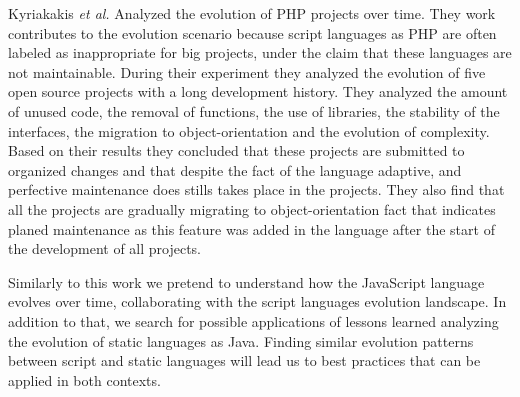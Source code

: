 Kyriakakis \emph{et al.} \cite{Kyriakakis2014ICMSE} Analyzed the evolution of PHP projects over time. They work contributes to the evolution scenario because script languages as PHP are often labeled as inappropriate for big projects, under the claim that these languages are not maintainable. During their experiment they analyzed the evolution of five open source projects with a long development history. They analyzed the amount of unused code, the removal of functions, the use of libraries, the stability of the interfaces, the migration to object-orientation and the evolution of complexity. Based on their results they concluded that these projects are submitted to organized changes and that despite the fact of the language adaptive, and perfective maintenance does stills takes place in the projects. They also find that all the projects are gradually migrating to object-orientation fact that indicates planed maintenance as this feature was added in the language after the start of the development of all projects. 

Similarly to this work we pretend to understand how the JavaScript language evolves over time, collaborating with the script languages evolution landscape. In addition to that, we search for possible applications of lessons learned analyzing the evolution of static languages as Java. Finding similar evolution patterns between script and static languages will lead us to best practices that can be applied in both contexts. 

